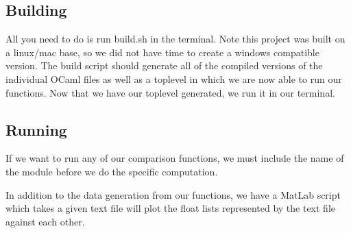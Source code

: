 \documentclass[11pt]{article} %
\begin{document}
\subsection{Building}
All you need to do is run build.sh in the terminal. Note this project was built on a linux/mac base, so we did not have time to create a windows compatible version. The build script should generate all of the compiled versions of the individual OCaml files as well as a toplevel in which we are now able to run our functions. Now that we have our toplevel generated, we run it in our terminal. 

\subsection{Running}
If we want to run any of our comparison functions, we must include the name of the module before we do the specific computation. 


In addition to the data generation from our functions, we have a MatLab script which takes a given text file will plot the float lists represented by the text file against each other. 

 
\end{document}

